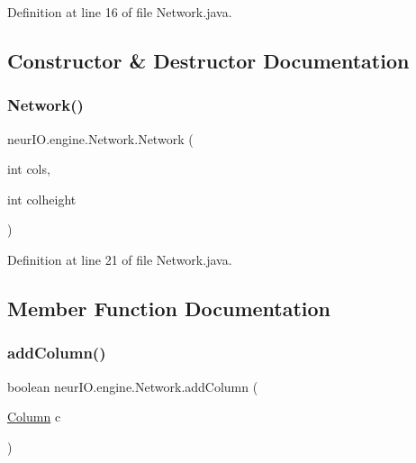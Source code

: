 Definition at line 16 of file Network.\+java.



\subsection{Constructor \& Destructor Documentation}
\mbox{\label{classneur_i_o_1_1engine_1_1_network_a33df63f4e69799f58a0c36e953c92ab0}} 
\subsubsection{\texorpdfstring{Network()}{Network()}}
{\footnotesize\ttfamily neur\+I\+O.\+engine.\+Network.\+Network (\begin{DoxyParamCaption}\item[{int}]{cols,  }\item[{int}]{colheight }\end{DoxyParamCaption})}



Definition at line 21 of file Network.\+java.



\subsection{Member Function Documentation}
\mbox{\label{classneur_i_o_1_1engine_1_1_network_ad46d0fee3e111e29a03431f5591eaf79}} 
\subsubsection{\texorpdfstring{add\+Column()}{addColumn()}}
{\footnotesize\ttfamily boolean neur\+I\+O.\+engine.\+Network.\+add\+Column (\begin{DoxyParamCaption}\item[{\hyperlink{classneur_i_o_1_1engine_1_1_column}{Column}}]{c }\end{DoxyParamCaption})}



